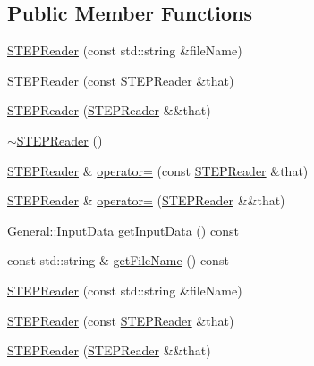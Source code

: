 \subsection*{Public Member Functions}
\begin{DoxyCompactItemize}
\item 
\hyperlink{classMcCAD_1_1IO_1_1STEPReader_aa6ca64ed74bc7c6fcf079c3742de34eb}{S\+T\+E\+P\+Reader} (const std\+::string \&file\+Name)
\item 
\hyperlink{classMcCAD_1_1IO_1_1STEPReader_a031c5146e7c40dfbc605b1075ccffec5}{S\+T\+E\+P\+Reader} (const \hyperlink{classMcCAD_1_1IO_1_1STEPReader}{S\+T\+E\+P\+Reader} \&that)
\item 
\hyperlink{classMcCAD_1_1IO_1_1STEPReader_a6098f3bc5d2ae6e4663e1b26b0348767}{S\+T\+E\+P\+Reader} (\hyperlink{classMcCAD_1_1IO_1_1STEPReader}{S\+T\+E\+P\+Reader} \&\&that)
\item 
\hyperlink{classMcCAD_1_1IO_1_1STEPReader_a7c17878fa8612e112c010f71ce24b887}{$\sim$\+S\+T\+E\+P\+Reader} ()
\item 
\hyperlink{classMcCAD_1_1IO_1_1STEPReader}{S\+T\+E\+P\+Reader} \& \hyperlink{classMcCAD_1_1IO_1_1STEPReader_a6ebf3c62dbea5fe58ca4f9808c9d35a1}{operator=} (const \hyperlink{classMcCAD_1_1IO_1_1STEPReader}{S\+T\+E\+P\+Reader} \&that)
\item 
\hyperlink{classMcCAD_1_1IO_1_1STEPReader}{S\+T\+E\+P\+Reader} \& \hyperlink{classMcCAD_1_1IO_1_1STEPReader_adf53dff13b4b21174d517992f101a909}{operator=} (\hyperlink{classMcCAD_1_1IO_1_1STEPReader}{S\+T\+E\+P\+Reader} \&\&that)
\item 
\hyperlink{classMcCAD_1_1General_1_1InputData}{General\+::\+Input\+Data} \hyperlink{classMcCAD_1_1IO_1_1STEPReader_a2c2f8e3747b56a13713ad8507334d4d4}{get\+Input\+Data} () const
\item 
const std\+::string \& \hyperlink{classMcCAD_1_1IO_1_1STEPReader_a0c37ee617ee8b153c82fd57638416f16}{get\+File\+Name} () const
\item 
\hyperlink{classMcCAD_1_1IO_1_1STEPReader_aa6ca64ed74bc7c6fcf079c3742de34eb}{S\+T\+E\+P\+Reader} (const std\+::string \&file\+Name)
\item 
\hyperlink{classMcCAD_1_1IO_1_1STEPReader_a031c5146e7c40dfbc605b1075ccffec5}{S\+T\+E\+P\+Reader} (const \hyperlink{classMcCAD_1_1IO_1_1STEPReader}{S\+T\+E\+P\+Reader} \&that)
\item 
\hyperlink{classMcCAD_1_1IO_1_1STEPReader_a6098f3bc5d2ae6e4663e1b26b0348767}{S\+T\+E\+P\+Reader} (\hyperlink{classMcCAD_1_1IO_1_1STEPReader}{S\+T\+E\+P\+Reader} \&\&that)

\end{DoxyCompactItemize}
